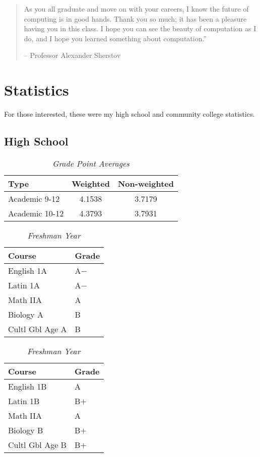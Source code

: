 \documentclass[11pt]{article}
\renewcommand{\it}[1]{\textit{{#1}}}
\begin{document}
\begin{quote}
  As you all graduate and move on with your careers, I know the future of
  computing is in good hands. Thank you so much; it has been a pleasure having
  you in this class. I hope you can see the beauty of computation as I do, and I
  hope you learned something about computation.''
  \vspace{-1em}
  \begin{flushright}
    -- Professor Alexander Sherstov
  \end{flushright}
\end{quote}


\newpage
\section{Statistics}
For those interested, these were my high school and community college
statistics.
\subsection{High School}
\begin{table}[ht]
    \centering
    \caption*{\it{Grade Point Averages}}
    \vspace{-0.8em}
    \begin{tabular}{l|c|c}
        Type       & Weighted     & Non-weighted \\
        \hline
        Academic 9-12  & 4.1538   & 3.7179 \\
        Academic 10-12 & 4.3793   & 3.7931 \\
    \end{tabular}
    \vspace{-1em}
\end{table}

\begin{table}[H]
    \centering
    \caption*{\it{Freshman Year}}
    \vspace{-0.8em}
    \begin{tabular}{l|l}
        Course          & Grade \\
        \hline
        English 1A      & A$-$  \\
        Latin 1A        & A$-$  \\
        Math IIA        & A   \\
        Biology A       & B   \\
        Cultl Gbl Age A & B   \\
    \end{tabular}
    \hspace{2em}
    \begin{tabular}{l|l}
        Course      & Grade \\
        \hline
        English 1B      & A   \\
        Latin 1B        & B$+$  \\
        Math IIA        & A   \\
        Biology B       & B$+$  \\
        Cultl Gbl Age B & B$+$  \\
    \end{tabular}
    \vspace{-1em}
\end{table}
\end{document}
